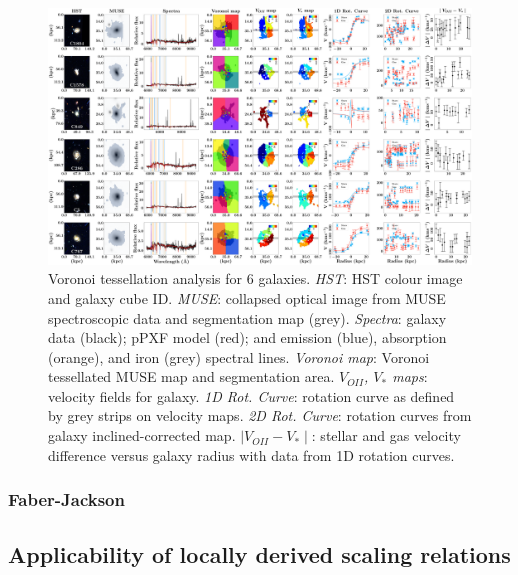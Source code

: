 \documentclass[12pt, twocolumn]{revtex4-1}    %
\begin{document}
\begin{figure}
\centering
\includegraphics[width=1.0\textheight,height=0.6\textwidth]{data/spectra_complete_velocities}
\caption[Tully-Fisher]{Voronoi tessellation analysis for 6 galaxies. \textit{HST}: HST colour image and galaxy cube ID. \textit{MUSE}: collapsed optical image from MUSE spectroscopic data and segmentation map (grey). \textit{Spectra}: galaxy data (black); pPXF model (red); and emission (blue), absorption (orange), and iron (grey) spectral lines. \textit{Voronoi map}: Voronoi tessellated MUSE map and segmentation area. \textit{$V_{OII}$, $V_{*}$ maps}: velocity fields for galaxy. \textit{1D Rot. Curve}: rotation curve as defined by grey strips on velocity maps. \textit{2D Rot. Curve}: rotation curves from galaxy inclined-corrected map. \textit{$\mid V_{OII}-V_* \mid$}: stellar and gas velocity difference versus galaxy radius with data from 1D rotation curves.}
\label{fig:multiple_spectra}
\end{figure}

\twocolumngrid

\vspace{2ex} %
\subsubsection{Faber-Jackson}
\noindent

\vspace{2ex} %
\subsection{Applicability of locally derived scaling relations}
\noindent

\vspace{2ex} %
\end{document}
